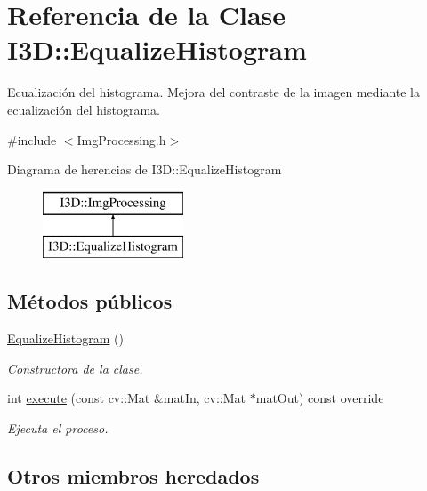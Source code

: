 \hypertarget{class_i3_d_1_1_equalize_histogram}{}\section{Referencia de la Clase I3D\+:\+:Equalize\+Histogram}
\label{class_i3_d_1_1_equalize_histogram}


Ecualización del histograma. Mejora del contraste de la imagen mediante la ecualización del histograma.  




{\ttfamily \#include $<$Img\+Processing.\+h$>$}

Diagrama de herencias de I3D\+:\+:Equalize\+Histogram\begin{figure}[H]
\begin{center}
\leavevmode
\includegraphics[height=2.000000cm]{class_i3_d_1_1_equalize_histogram}
\end{center}
\end{figure}
\subsection*{Métodos públicos}
\begin{DoxyCompactItemize}
\item 
\hyperlink{class_i3_d_1_1_equalize_histogram_afd85554f82ab1fe8b0ded39fd181012d}{Equalize\+Histogram} ()
\begin{DoxyCompactList}\small\item\em Constructora de la clase. \end{DoxyCompactList}\item 
int \hyperlink{class_i3_d_1_1_equalize_histogram_ac748887f28d189287a120b5c6b0977a2}{execute} (const cv\+::\+Mat \&mat\+In, cv\+::\+Mat $\ast$mat\+Out) const  override
\begin{DoxyCompactList}\small\item\em Ejecuta el proceso. \end{DoxyCompactList}\end{DoxyCompactItemize}
\subsection*{Otros miembros heredados}


